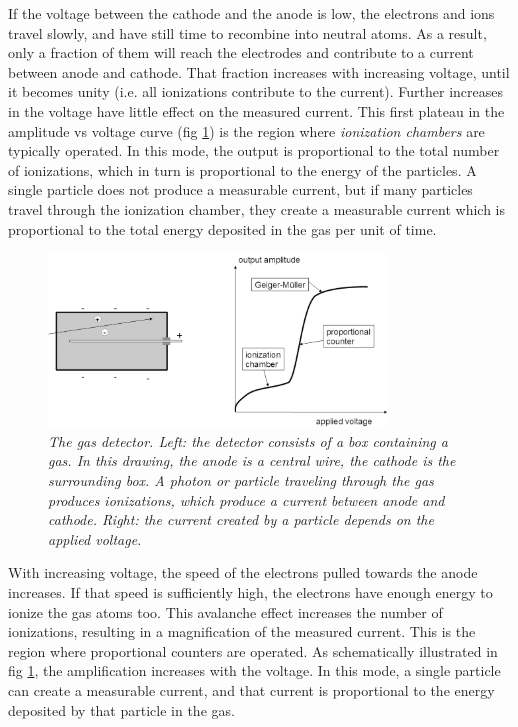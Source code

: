 \documentclass[11pt,oneside]{article}
\begin{document}
If the voltage between the cathode and the anode is low, the electrons
and ions travel slowly, and have still time to recombine into
neutral atoms. As a result, only a fraction of them will reach the
electrodes and contribute to a current between anode and cathode.
That fraction increases with
increasing voltage, until it becomes unity (i.e. all ionizations
contribute to the current). Further increases in the voltage have
little effect on the measured current. This first plateau in the
amplitude vs voltage curve (fig \ref{fig:gasdetector}) is the
region where {\em ionization chambers} are typically operated. In this mode,
the output is proportional to the total number of ionizations, which in
turn is proportional to the energy of the particles. A single particle
does not produce a measurable current, but if many particles travel
through the ionization chamber, they create a measurable current which
is proportional to the total energy deposited in the gas per unit of time.
%
\begin{figure}[thb]
\includegraphics[width=0.8\textwidth]{figs/fig_gasdetector.pdf}
\caption{\label{fig:gasdetector} \emph{The gas detector.
Left: the detector consists of a box containing a gas. In this drawing,
the anode is a central wire, the cathode is the surrounding box. A photon
or particle traveling through the gas produces ionizations, which produce
a current between anode and cathode. Right: the current created by
a particle depends on the applied voltage.}}
\end{figure}

With increasing voltage, the speed of the electrons pulled towards the
anode increases. If that speed is sufficiently high, the electrons
have enough energy to ionize the gas atoms too. This avalanche
effect increases the number of ionizations, resulting in a magnification
of the measured current. This is the region where proportional
counters are operated. As schematically illustrated in fig
\ref{fig:gasdetector}, the amplification increases with the voltage.
In this mode, a single particle can create a measurable current, and
that current is proportional to the energy deposited by that particle 
in the gas.
\end{document}
